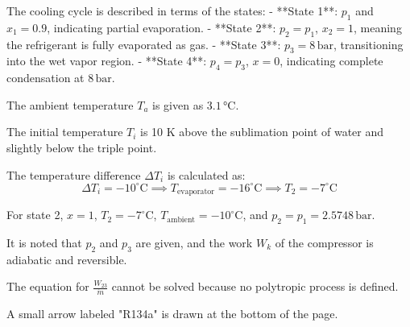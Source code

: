 The cooling cycle is described in terms of the states:  
- **State 1**: \( p_1 \) and \( x_1 = 0.9 \), indicating partial evaporation.  
- **State 2**: \( p_2 = p_1 \), \( x_2 = 1 \), meaning the refrigerant is fully evaporated as gas.  
- **State 3**: \( p_3 = 8 \, \text{bar} \), transitioning into the wet vapor region.  
- **State 4**: \( p_4 = p_3 \), \( x = 0 \), indicating complete condensation at \( 8 \, \text{bar} \).  

The ambient temperature \( T_a \) is given as \( 3.1 \, \text{°C} \).  

The initial temperature \( T_i \) is 10 K above the sublimation point of water and slightly below the triple point.  

The temperature difference \( \Delta T_i \) is calculated as:  
\[
\Delta T_i = -10^\circ\text{C} \implies T_{\text{evaporator}} = -16^\circ\text{C} \implies T_2 = -7^\circ\text{C}
\]

For state 2, \( x = 1 \), \( T_2 = -7^\circ\text{C} \), \( T_{\text{ambient}} = -10^\circ\text{C} \), and \( p_2 = p_1 = 2.5748 \, \text{bar} \).  

It is noted that \( p_2 \) and \( p_3 \) are given, and the work \( W_k \) of the compressor is adiabatic and reversible.  

The equation for \( \frac{W_{23}}{\dot{m}} \) cannot be solved because no polytropic process is defined.  

A small arrow labeled "R134a" is drawn at the bottom of the page.